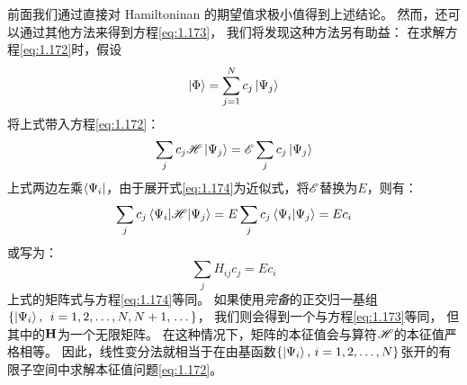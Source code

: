 前面我们通过直接对 Hamiltoninan 的期望值求极小值得到上述结论。
然而，还可以通过其他方法来得到方程\eqref{eq:1.173}，
我们将发现这种方法另有助益：
在求解方程\eqref{eq:1.172}时，假设
\begin{equation}
 \Ket{\Phi} = \sum_{j=1}^N c_j\Ket{\Psi_j}
 \label{eq:1.174}
\end{equation}
将上式带入方程\eqref{eq:1.172}：
\begin{equation}
 \sum_j c_j \mathscr{H}\Ket{\Psi_j} = \mathscr{E} \sum_j c_j \Ket{\Psi_j}
 \label{eq:1.175}
\end{equation}
上式两边左乘$\Bra{\Psi_i}$，由于展开式\eqref{eq:1.174}为近似式，将$\mathscr{E}$替换为$E$，则有：
\[
\sum_j c_j \left\langle \Psi_i\middle\vert \mathscr{H} \middle\vert \Psi_j\right\rangle = E\sum_j c_j \left\langle \Psi_i \middle\vert \Psi_j \right\rangle = Ec_i
\]
或写为：
\begin{equation}
 \sum_j H_{ij}c_j = E c_i
 \label{eq:1.176}
\end{equation}
上式的矩阵式与方程\eqref{eq:1.174}等同。
如果使用\emph{完备}的正交归一基组 $\left\{\Ket{\Psi_i},
\right. \, i = 1, 2,\allowbreak \dots, N, N+1, \left.\dots \right\}$，
我们则会得到一个与方程\eqref{eq:1.173}等同，
但其中的$\mathbf{H}$为一个无限矩阵。
在这种情况下，矩阵的本征值会与算符$\mathscr{H}$的本征值严格相等。
因此，线性变分法就相当于在由基函数$\left\{\Ket{\Psi_i},\,i=1,2,\dots,N\right\}$张开的有限子空间中求解本征值问题\eqref{eq:1.172}。
 
 
 

